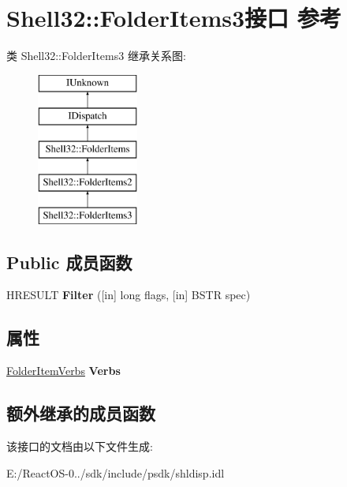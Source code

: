\hypertarget{interface_shell32_1_1_folder_items3}{}\section{Shell32\+:\+:Folder\+Items3接口 参考}
\label{interface_shell32_1_1_folder_items3}
类 Shell32\+:\+:Folder\+Items3 继承关系图\+:\begin{figure}[H]
\begin{center}
\leavevmode
\includegraphics[height=5.000000cm]{interface_shell32_1_1_folder_items3}
\end{center}
\end{figure}
\subsection*{Public 成员函数}
\begin{DoxyCompactItemize}
\item 
\mbox{\label{interface_shell32_1_1_folder_items3_a7e77c7a02213ed51718a2d8df4b2daac}} 
H\+R\+E\+S\+U\+LT {\bfseries Filter} (\mbox{[}in\mbox{]} long flags, \mbox{[}in\mbox{]} B\+S\+TR spec)
\end{DoxyCompactItemize}
\subsection*{属性}
\begin{DoxyCompactItemize}
\item 
\mbox{\label{interface_shell32_1_1_folder_items3_a44bb9fa0d9cbafec592aa795f6dadd59}} 
\hyperlink{interface_shell32_1_1_folder_item_verbs}{Folder\+Item\+Verbs} {\bfseries Verbs}
\end{DoxyCompactItemize}
\subsection*{额外继承的成员函数}


该接口的文档由以下文件生成\+:\begin{DoxyCompactItemize}
\item 
E\+:/\+React\+O\+S-\/0../sdk/include/psdk/shldisp.\+idl\end{DoxyCompactItemize}
